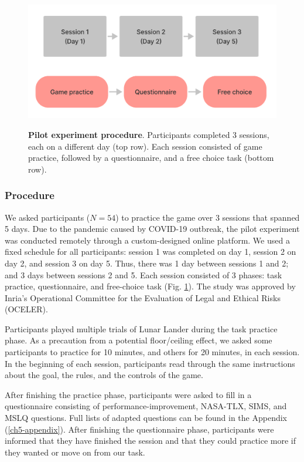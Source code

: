 \begin{figure}[bth]
    \centering
    {\includegraphics[width=\linewidth]{Figures/c5/procedure.pdf}}
    \caption[short figure description]{\textbf{Pilot experiment procedure}. Participants completed 3 sessions, each on a different day (top row). Each session consisted of game practice, followed by a questionnaire, and a free choice task (bottom row).}\label{fig:5-procedure}
\end{figure}

\subsubsection{Procedure} 
We asked participants ($N=54$) to practice the game over 3 sessions that spanned 5 days. Due to the pandemic caused by COVID-19 outbreak, the pilot experiment was conducted remotely through a custom-designed online platform. We used a fixed schedule for all participants: session 1 was completed on day 1, session 2 on day 2, and session 3 on day 5. Thus, there was 1 day between sessions 1 and 2; and 3 days between sessions 2 and 5. Each session consisted of 3 phases: task practice, questionnaire, and free-choice task (Fig. \ref{fig:5-procedure}). The study was approved by Inria's Operational Committee for the Evaluation of Legal and Ethical Risks (OCELER).

Participants played multiple trials of Lunar Lander during the task practice phase. As a precaution from a potential floor/ceiling effect, we asked some participants to practice for 10 minutes, and others for 20 minutes, in each session. In the beginning of each session, participants read through the same instructions about the goal, the rules, and the controls of the game.

After finishing the practice phase, participants were asked to fill in a questionnaire consisting of performance-improvement, NASA-TLX, \ac{SIMS}, and \ac{MSLQ} questions. Full lists of adapted questions can be found in the Appendix (\autoref{ch5-appendix}). After finishing the questionnaire phase, participants were informed that they have finished the session and that they could practice more if they wanted or move on from our task.

